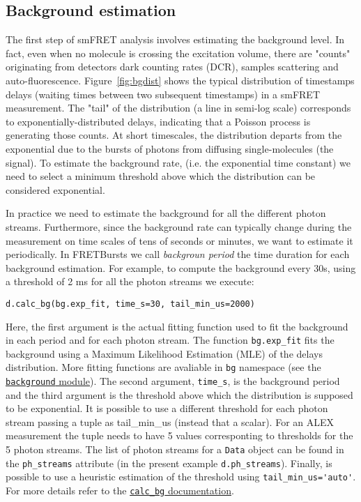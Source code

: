 \subsection{Background estimation}

The first step of smFRET analysis involves estimating the background level. In fact, even when no molecule is crossing the excitation volume, there are "counts" originating from detectors dark counting rates (DCR), samples scattering and auto-fluorescence. Figure~\ref{fig:bgdist} shows the typical distribution of timestamps delays (waiting times between two subsequent timestamps) in a smFRET measurement. The "tail" of the distribution (a line in semi-log scale) corresponds to exponentially-distributed delays, indicating that a Poisson process is generating those counts. At short timescales, the distribution departs from the exponential due to the bursts of photons from diffusing single-molecules (the signal).
To estimate the background rate, (i.e. the exponential time constant) we need to select a minimum threshold above which the distribution can be considered exponential. 

In practice we need to estimate the background for all the different photon streams. Furthermore, since the background rate can typically change during the measurement on time scales of tens of seconds or minutes, we want to estimate it periodically. 
In FRETBursts we call \textit{backgroun period} the time duration for each background estimation. For example, to compute the background every 30s, using a threshold of 2 ms for all the photon streams we execute:

\verb|d.calc_bg(bg.exp_fit, time_s=30, tail_min_us=2000)|

Here, the first argument is the actual fitting function used to fit the background in each period and for each photon stream. The function \verb|bg.exp_fit| fits the background using a Maximum Likelihood Estimation (MLE) of the delays distribution. More fitting functions are avaliable in \verb|bg| namespace (see the \href{http://fretbursts.readthedocs.org/en/latest/background.html}{\verb|background| module}). The second argument, \verb|time_s|, is the background period and the third argument is the threshold above which the distribution is supposed to be exponential. It is possible to use a different threshold for each photon stream passing a tuple as tail_min_us (instead that a scalar). For an ALEX measurement the tuple needs to have 5 values corresponting to thresholds for the 5 photon streams. The list of photon streams for a \verb|Data| object can be found in the \verb|ph_streams| attribute (in the present example \verb|d.ph_streams|). Finally, is possible to use a heuristic estimation of the threshold using \verb|tail_min_us='auto'|. For more details refer to the \href{http://fretbursts.readthedocs.org/en/latest/data_class.html#fretbursts.burstlib.Data.calc_bg}{\verb|calc_bg| documentation}.

